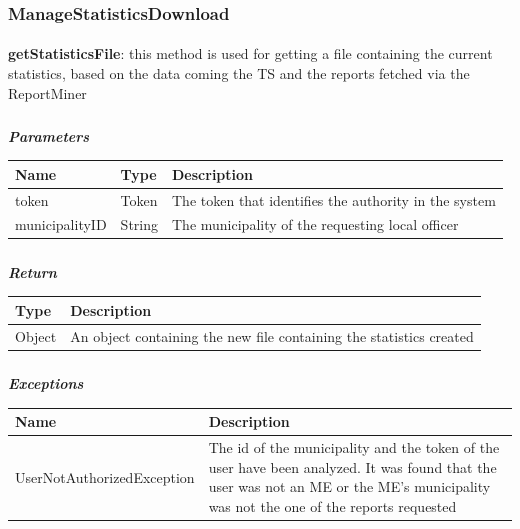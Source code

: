 				\subsubsection{ManageStatisticsDownload}
					\paragraph{}
							\textbf{getStatisticsFile}: this method is used for getting a file containing the current statistics, based on the data coming the TS and the reports fetched via the ReportMiner
							\subparagraph{}
							\vspace{-3mm}
							\textit{\textbf{Parameters}}
							\vspace{-2mm}
								\begin{table}[!h]
									\begin{tabular}{L{0.2\textwidth}L{0.15\textwidth}L{0.45\textwidth}}
										\toprule
										\textbf{Name} & \textbf{Type} & \textbf{Description} \\
										\midrule
								  		token & Token & The token that identifies the authority in the system \\
								  		municipalityID & String & The municipality of the requesting local officer \\
								 		\bottomrule
									\end{tabular}
								\end{table}
							\subparagraph{}
							\vspace{-6mm}
								\textit{\textbf{Return}}
								\vspace{-2mm}
									\begin{table}[!h]
									\begin{tabular}{L{0.2\textwidth}L{0.6\textwidth}}
										\toprule
										\textbf{Type} & \textbf{Description} \\
										\midrule
								  		Object & An object containing the new file containing the statistics created \\
								 		\bottomrule
									\end{tabular}
								\end{table}
							\clearpage
							\subparagraph{}
								\textit{\textbf{Exceptions}}
								\vspace{-2mm}
									\begin{table}[!h]
									\begin{tabular}{L{0.4\textwidth}L{0.4\textwidth}}
										\toprule
										\textbf{Name} & \textbf{Description} \\
										\midrule
								  		UserNotAuthorizedException & The id of the municipality and the token of the user have been analyzed. It was found that the user was not an ME or the ME's  municipality was not the one of the reports requested  \\
								 		\bottomrule
									\end{tabular}
								\end{table}
								
